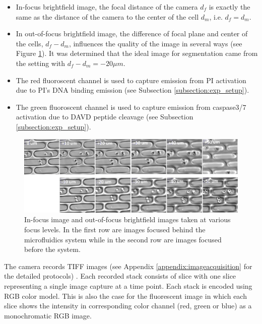 \documentclass[pdftex,12pt,a4paper]{report}
\begin{document}
\begin{itemize}
\item In-focus brightfield image, the focal distance of the camera $d_f$ is exactly the same as the distance of the camera to the center of the cell $d_m$, i.e. $d_f = d_m$.

\item In out-of-focus brightfield image, the difference of focal plane and center of the cells, $d_f - d_m$, influences the quality of the image in several ways (see Figure \ref{fig:focustest}). It was determined that the ideal image for segmentation came from the setting with $d_f - d_m = -20 \mu m$.

\item The red fluoroscent channel is used to capture emission from PI activation due to PI's DNA binding emission (see Subsection \ref{subsection:exp_setup}).

\item The green fluoroscent channel is used to capture emission from caspase3/7 activation due to DAVD peptide cleavage (see Subsection \ref{subsection:exp_setup}).
\end{itemize}


\begin{figure}[H]
\centering
\includegraphics[width=\textwidth]{images/focus/pict.pdf}
\caption[Effect on focal plane on out-of-focus image]{In-focus image and out-of-focus brightfield images taken at various focus levels.  In the first row are images focused behind the microfluidics system while in the second row are images focused before the system.}
\label{fig:focustest}
\end{figure}

The camera records TIFF images (see Appendix \ref{appendix:imageacquisition} for the detailed protocols) \cite{loc2006tiff}. Each recorded stack consists of slice with one slice representing a single image capture at a time point. Each stack is encoded using RGB color model. This is also the case for the fluorescent image in which each slice shows the intensity in corresponding color channel (red, green or blue) as a monochromatic RGB image.
\end{document}
